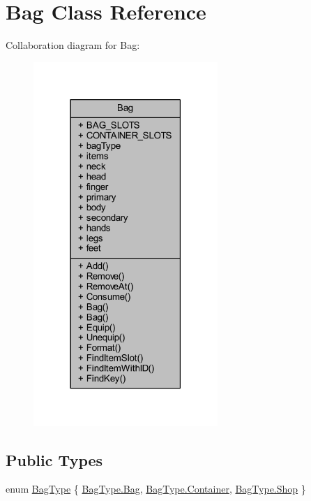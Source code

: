 \hypertarget{class_bag}{}\section{Bag Class Reference}
\label{class_bag}


Collaboration diagram for Bag\+:
\nopagebreak
\begin{figure}[H]
\begin{center}
\leavevmode
\includegraphics[width=198pt]{class_bag__coll__graph}
\end{center}
\end{figure}
\subsection*{Public Types}
\begin{DoxyCompactItemize}
\item 
enum \mbox{\hyperlink{class_bag_a5a827c44705d57202edc93b9a39316c7}{Bag\+Type}} \{ \mbox{\hyperlink{class_bag_a5a827c44705d57202edc93b9a39316c7ad3ab3d5184fe9b1b4428e4ffb797bdca}{Bag\+Type.\+Bag}}, 
\mbox{\hyperlink{class_bag_a5a827c44705d57202edc93b9a39316c7a0e7278cda02a9c0446dcc75a4df34eb2}{Bag\+Type.\+Container}}, 
\mbox{\hyperlink{class_bag_a5a827c44705d57202edc93b9a39316c7a9f82518d468b9fee614fcc92f76bb163}{Bag\+Type.\+Shop}}
 \}
\end{DoxyCompactItemize}
